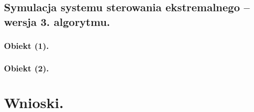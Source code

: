 \documentclass[a4paper,10pt]{article}
\begin{document}


\subsection{Symulacja systemu sterowania ekstremalnego – wersja 3. algorytmu.}

\subsubsection{Obiekt (1).}



\subsubsection{Obiekt (2).}
\section{Wnioski.}\label{sec:wnioski}
\end{document}
